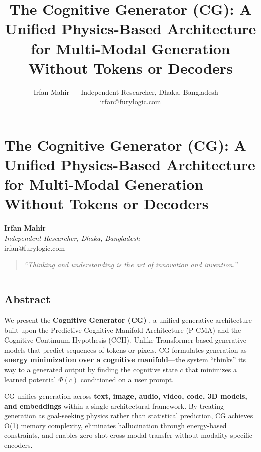 \documentclass[
  11pt,
  a4paper,
]{article}
\title{The Cognitive Generator (CG): A Unified Physics-Based
Architecture for Multi-Modal Generation Without Tokens or Decoders}
\author{Irfan Mahir --- Independent Researcher, Dhaka, Bangladesh ---
irfan@furylogic.com}
\date{}
\begin{document}
\maketitle

{
\hypersetup{linkcolor=}
\setcounter{tocdepth}{3}
\tableofcontents
}
\section{The Cognitive Generator (CG): A Unified Physics-Based
Architecture for Multi-Modal Generation Without Tokens or
Decoders}\label{the-cognitive-generator-cg-a-unified-physics-based-architecture-for-multi-modal-generation-without-tokens-or-decoders}

\textbf{Irfan Mahir}\\
\emph{Independent Researcher, Dhaka, Bangladesh}\\
irfan@furylogic.com

\begin{quote}
\emph{``Thinking and understanding is the art of innovation and
invention.''}
\end{quote}

\begin{center}\rule{0.5\linewidth}{0.5pt}\end{center}

\subsection{Abstract}\label{abstract}

We present the \textbf{Cognitive Generator (CG)} , a unified generative
architecture built upon the Predictive Cognitive Manifold Architecture
(P-CMA) and the Cognitive Continuum Hypothesis (CCH). Unlike
Transformer-based generative models that predict sequences of tokens or
pixels, CG formulates generation as \textbf{energy minimization over a
cognitive manifold}---the system ``thinks'' its way to a generated
output by finding the cognitive state \(c\) that minimizes a learned
potential \(\Phi(c)\) conditioned on a user prompt.

CG unifies generation across \textbf{text, image, audio, video, code, 3D
models, and embeddings} within a single architectural framework. By
treating generation as goal-seeking physics rather than statistical
prediction, CG achieves O(1) memory complexity, eliminates hallucination
through energy-based constraints, and enables zero-shot cross-modal
transfer without modality-specific encoders.
\end{document}
